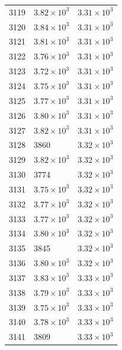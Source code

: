 \begin{table}[H]
\begin{tabular}{lll}
3119 & $\displaystyle 3.82 \times 10^{3}$ & $\displaystyle 3.31 \times 10^{3}$ \\
3120 & $\displaystyle 3.84 \times 10^{3}$ & $\displaystyle 3.31 \times 10^{3}$ \\
3121 & $\displaystyle 3.81 \times 10^{3}$ & $\displaystyle 3.31 \times 10^{3}$ \\
3122 & $\displaystyle 3.76 \times 10^{3}$ & $\displaystyle 3.31 \times 10^{3}$ \\
3123 & $\displaystyle 3.72 \times 10^{3}$ & $\displaystyle 3.31 \times 10^{3}$ \\
3124 & $\displaystyle 3.75 \times 10^{3}$ & $\displaystyle 3.31 \times 10^{3}$ \\
3125 & $\displaystyle 3.77 \times 10^{3}$ & $\displaystyle 3.31 \times 10^{3}$ \\
3126 & $\displaystyle 3.80 \times 10^{3}$ & $\displaystyle 3.31 \times 10^{3}$ \\
3127 & $\displaystyle 3.82 \times 10^{3}$ & $\displaystyle 3.31 \times 10^{3}$ \\
3128 & 3860 & $\displaystyle 3.32 \times 10^{3}$ \\
3129 & $\displaystyle 3.82 \times 10^{3}$ & $\displaystyle 3.32 \times 10^{3}$ \\
3130 & 3774 & $\displaystyle 3.32 \times 10^{3}$ \\
3131 & $\displaystyle 3.75 \times 10^{3}$ & $\displaystyle 3.32 \times 10^{3}$ \\
3132 & $\displaystyle 3.77 \times 10^{3}$ & $\displaystyle 3.32 \times 10^{3}$ \\
3133 & $\displaystyle 3.77 \times 10^{3}$ & $\displaystyle 3.32 \times 10^{3}$ \\
3134 & $\displaystyle 3.80 \times 10^{3}$ & $\displaystyle 3.32 \times 10^{3}$ \\
3135 & 3845 & $\displaystyle 3.32 \times 10^{3}$ \\
3136 & $\displaystyle 3.80 \times 10^{3}$ & $\displaystyle 3.32 \times 10^{3}$ \\
3137 & $\displaystyle 3.83 \times 10^{3}$ & $\displaystyle 3.33 \times 10^{3}$ \\
3138 & $\displaystyle 3.79 \times 10^{3}$ & $\displaystyle 3.33 \times 10^{3}$ \\
3139 & $\displaystyle 3.75 \times 10^{3}$ & $\displaystyle 3.33 \times 10^{3}$ \\
3140 & $\displaystyle 3.78 \times 10^{3}$ & $\displaystyle 3.33 \times 10^{3}$ \\
3141 & 3809 & $\displaystyle 3.33 \times 10^{3}$ \\

\end{tabular}
\end{table}
